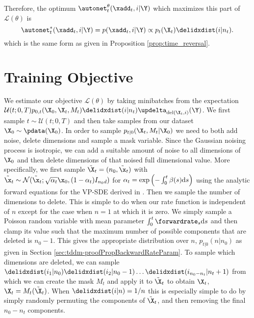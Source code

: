 Therefore, the optimum $\autonet_t^\theta(\xadd_t, i | \Y)$ which maximizes this part of $\mathcal{L}(\theta)$ is
\begin{equation}
    \autonet_t^*(\xadd_t, i | \Y) = p(\xadd_t, i | \Y) \propto p_t(\X_t) \delidxdist(i | n_t) . 
\end{equation}
which is the same form as given in Proposition \ref{prop:time_reversal}.



\section{Training Objective}
\label{sec:tddm-ApdxTrainingObjective}
We estimate our objective $\mathcal{L}(\theta)$ by taking minibatches from the expectation $\mathcal{U}(t; 0, T) p_{0,t}(\X_0, \X_t, M_t) \delidxdist(i | n_t) \updelta_{\text{del}(\X_t, i)}(\Y)$. We first sample $t \sim \mathcal{U}(t; 0, T)$ and then take samples from our dataset $\X_0 \sim \pdata(\X_0)$. In order to sample $p_{t|0}(\X_t, M_t | \X_0)$ we need to both add noise, delete dimensions and sample a mask variable. Since the Gaussian noising process is isotropic, we can add a suitable amount of noise to all dimensions of $\X_0$ and then delete dimensions of that noised full dimensional value. More specifically, we first sample $\tilde{\X}_t = (n_0, \tilde{\x}_t)$ with $\tilde{\x}_t \sim \mathcal{N}(\tilde{\x}_t; \sqrt{\alpha_t} \x_0, (1 - \alpha_t) I_{n_0 d})$ for $\alpha_t = \text{exp}\left( - \int_0^t \beta(s) \mathrm{d} s \right)$ using the analytic forward equations for the VP-SDE derived in \cite{song2020score}. Then we sample the number of dimensions to delete. This is simple to do when our rate function is independent of $n$ except for the case when $n=1$ at which it is zero. We simply sample a Poisson random variable with mean parameter $\int_0^t \forwardrate_s \rmd s$ and then clamp its value such that the maximum number of possible components that are deleted is $n_0 - 1$. This gives the appropriate distribution over $n$, $p_{t|0}(n | n_0)$ as given in Section \ref{sec:tddm-proofPropBackwardRateParam}. To sample which dimensions are deleted, we can sample $\delidxdist(i_1 | n_0) \delidxdist(i_2 | n_0-1) \dots \delidxdist(i_{n_0 - n_t} | n_t+1)$ from which we can create the mask $M_t$ and apply it to $\tilde{\X}_t$ to obtain $\X_t$, $\X_t = M_t(\tilde{\X}_t)$. When $\delidxdist(i | n) = 1/n$ this is especially simple to do by simply randomly permuting the components of $\tilde{\X}_t$, and then removing the final $n_0 - n_t$ components.\\


